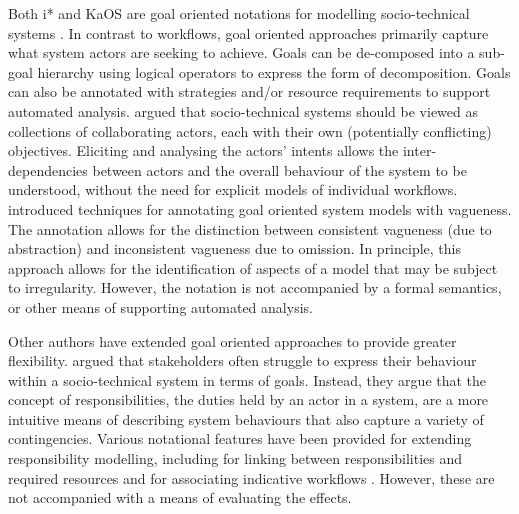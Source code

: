 \documentclass{llncs}
\begin{document}
Both i* \citep{yu1995social} and KaOS \citep{dardenne93goal} are goal oriented notations for modelling socio-technical
systems \cite{werneck2009goreistarkaos}.  In contrast to workflows, goal oriented approaches primarily capture what
system actors are seeking to achieve.  Goals can be de-composed into a sub-goal hierarchy using logical operators to
express the form of decomposition. Goals can also be annotated with strategies and/or resource requirements to support
automated analysis.  \citet{yu1995social} argued that socio-technical systems should be viewed as collections of
collaborating actors, each with their own (potentially conflicting) objectives.  Eliciting and analysing the actors'
intents allows the inter-dependencies between actors and the overall behaviour of the system to be understood, without
the need for explicit models of individual workflows. \citet{herrmann1999vagueness} introduced techniques for annotating
goal oriented system models with vagueness.  The annotation allows for the distinction between consistent vagueness (due
to abstraction) and inconsistent vagueness due to omission.  In principle, this approach allows for the identification
of aspects of a model that may be subject to irregularity.  However, the notation is not accompanied by a formal semantics,
or other means of supporting automated analysis.

Other authors have extended goal oriented approaches to provide greater flexibility. \citet{sommerville09deriving}
argued that stakeholders often struggle to express their behaviour within a socio-technical system in terms of goals.
Instead, they argue that the concept of responsibilities, the duties held by an actor in a system, are a more intuitive
means of describing system behaviours that also capture a variety of contingencies.  Various notational features
have been provided for extending responsibility modelling, including for linking between responsibilities and required
resources and for associating indicative workflows \citep{dewsbury07responsibility}.  However, these are not accompanied
with a means of evaluating the effects.
\end{document}
